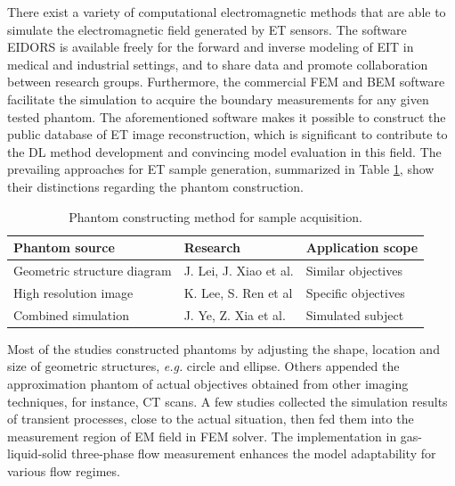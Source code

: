 There exist a variety of computational electromagnetic methods that are able to simulate the electromagnetic field generated by ET sensors.
The software EIDORS is available freely for the forward and inverse modeling of EIT in medical and industrial settings, and to share data and promote collaboration between research groups\cite{Gao2019EIT,Smyl2020Optimizing}.
Furthermore, the commercial FEM and BEM software facilitate the simulation to acquire the boundary measurements for any given tested phantom.
The aforementioned software makes it possible to construct the public database of ET image reconstruction\cite{Zheng2018A}, which is significant to contribute to the DL method development and convincing model evaluation in this field.
The prevailing approaches for ET sample generation, summarized in Table \ref{tab:phantom}, show their distinctions regarding the phantom construction.

\begin{table}
\caption{Phantom constructing method for sample acquisition.}\label{tab:phantom}
  \centering
  \footnotesize{
  \begin{tabular}{p{2cm}p{2cm}p{3.5cm}}
  \hline
   Phantom source & Research & Application scope\\
  \hline
   Geometric structure diagram& J. Lei, J. Xiao et al.\cite{Yang2019Big,Lei2020Computational,Xiao2018Deep,Lei2018Deep,Chen2019Electrical,Tian2019Image,Smyl2020Optimizing,Capps2021Reconstruction} & Similar objectives\\
   High resolution image&  K. Lee, S. Ren et al\cite{Ren2020ATwo,Lee2020Electrical}& Specific objectives\\
   Combined simulation& J. Ye, Z. Xia et al.\cite{Ye2020Investigation,Xia2020Generative} &Simulated subject\\
  \hline
  \end{tabular}}
\end{table}


Most of the studies constructed phantoms by adjusting the shape, location and size of geometric structures, \emph{e.g.} circle and ellipse.
Others appended the approximation phantom of actual objectives obtained from other imaging techniques, for instance, CT scans.
A few studies collected the simulation results of transient processes, close to the actual situation, then fed them into the measurement region of EM field in FEM solver\cite{Xia2020Generative}.
The implementation in gas-liquid-solid three-phase flow measurement enhances the model adaptability for various flow regimes.

